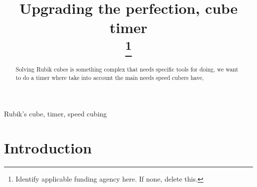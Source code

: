 \documentclass[conference]{IEEEtran}
\begin{document}
\title{Upgrading the perfection, cube timer\\
\thanks{Identify applicable funding agency here. If none, delete this.}
}

\author{
\and
{}
\and


}

\maketitle

\begin{abstract}
Solving Rubik cubes is something complex that needs specific tools for doing, we want to do a timer where take into account the main needs speed cubers have, 
\end{abstract}

\begin{IEEEkeywords}
Rubik's cube, timer, speed cubing
\end{IEEEkeywords}

\section{Introduction}
\end{document}
